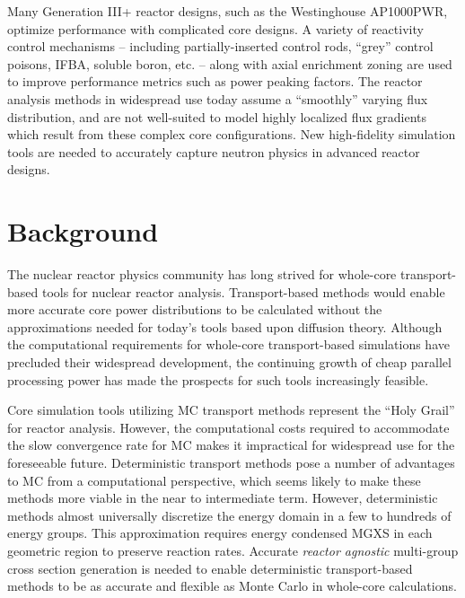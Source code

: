 Many Generation III+ reactor designs, such as the Westinghouse AP1000\texttrademark \ac{PWR}, optimize performance with complicated core designs. A variety of reactivity control mechanisms -- including partially-inserted control rods, ``grey'' control poisons, \ac{IFBA}, soluble boron, etc. -- along with axial enrichment zoning are used to improve performance metrics such as power peaking factors. The reactor analysis methods in widespread use today assume a ``smoothly'' varying flux distribution, and are not well-suited to model highly localized flux gradients which result from these complex core configurations. New high-fidelity simulation tools are needed to accurately capture neutron physics in advanced reactor designs.


\section{Background}
\label{sec:chap1-background}


The nuclear reactor physics community has long strived for whole-core transport-based tools for nuclear reactor analysis. Transport-based methods would enable more accurate core power distributions to be calculated without the approximations needed for today’s tools based upon diffusion theory. Although the computational requirements for whole-core transport-based simulations have precluded their widespread development, the continuing growth of cheap parallel processing power has made the prospects for such tools increasingly feasible.


Core simulation tools utilizing \ac{MC} transport methods represent the ``Holy Grail'' for reactor analysis. However, the computational costs required to accommodate the slow convergence rate for \ac{MC} makes it impractical for widespread use for the foreseeable future. Deterministic transport methods pose a number of advantages to \ac{MC} from a computational perspective, which seems likely to make these methods more viable in the near to intermediate term. However, deterministic methods almost universally discretize the energy domain in a few to hundreds of energy groups. This approximation requires energy condensed \ac{MGXS} in each geometric region to preserve reaction rates. Accurate \emph{reactor agnostic} multi-group cross section generation is needed to enable deterministic transport-based methods to be as accurate and flexible as Monte Carlo in whole-core calculations.

